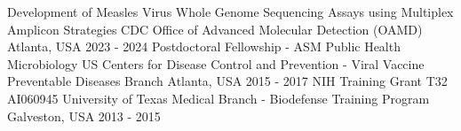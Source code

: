   \vspace{-2.0mm}

\begin{cventries}

  \vspace{-2.0mm}
  \cventry
    {Development of Measles Virus Whole Genome Sequencing Assays using Multiplex Amplicon Strategies} %
    {CDC Office of Advanced Molecular Detection (OAMD)} %
    {Atlanta, USA} %
    {2023 - 2024} %
    {} 
  \vspace{-2.0mm}
  \cventry
    {Postdoctoral Fellowship - ASM Public Health Microbiology} %
    {US Centers for Disease Control and Prevention - Viral Vaccine Preventable Diseases Branch} %
    {Atlanta, USA} %
    {2015 - 2017} %
    {} 
  \vspace{-2.0mm}
  \cventry
    {NIH Training Grant T32 AI060945} %
    {University of Texas Medical Branch - Biodefense Training Program} %
    {Galveston, USA} %
    {2013 - 2015} %
    {}
  \vspace{-4.0mm}
\end{cventries}
